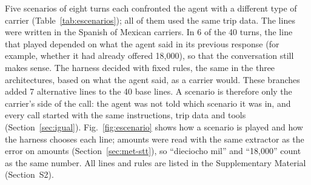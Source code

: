 \documentclass[11pt]{article}
\newcommand{\RGuionAlt}{7}
\newcommand{\RGuionBase}{40}
\newcommand{\RGuionTurnosConRamas}{6}
\begin{document}
Five scenarios of eight turns each confronted the agent with a different type of carrier (Table~\ref{tab:escenarios}); all of them used the same trip data. The lines were written in the Spanish of Mexican carriers. In \RGuionTurnosConRamas{} of the
\RGuionBase{} turns, the line that played depended on what the agent said in its
previous response (for example, whether it had already offered 18,000), so that the
conversation still makes sense. The harness decided with fixed rules, the same in the
three architectures, based on what the agent said, as a carrier would. These branches added \RGuionAlt{} alternative lines to the \RGuionBase{} base lines.
A scenario is therefore only the carrier's side of the call: the agent was not told which scenario it was in, and every call started with the same instructions, trip data and tools (Section~\ref{sec:igual}).
Fig.~\ref{fig:escenario} shows how a scenario is played and how the harness chooses each line; amounts were read with the same extractor as the error on amounts (Section~\ref{sec:met-stt}), so ``dieciocho mil'' and ``18,000'' count as the same number.
All lines and rules are listed in the Supplementary Material (Section~S2).
\end{document}
